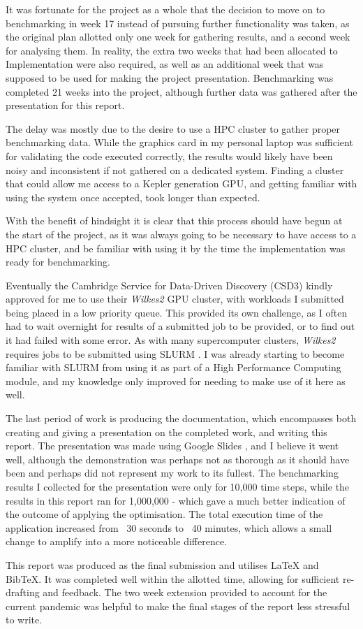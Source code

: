 It was fortunate for the project as a whole that the decision to move on to benchmarking in week 17 instead of pursuing further functionality was taken, as the original plan allotted only one week for gathering results, and a second week for analysing them. In reality, the extra two weeks that had been allocated to Implementation were also required, as well as an additional week that was supposed to be used for making the project presentation. Benchmarking was completed 21 weeks into the project, although further data was gathered after the presentation for this report.
\par
The delay was mostly due to the desire to use a HPC cluster to gather proper benchmarking data. While the graphics card in my personal laptop was sufficient for validating the code executed correctly, the results would likely have been noisy and inconsistent if not gathered on a dedicated system. Finding a cluster that could allow me access to a Kepler generation GPU, and getting familiar with using the system once accepted, took longer than expected.
\par
With the benefit of hindsight it is clear that this process should have begun at the start of the project, as it was always going to be necessary to have access to a HPC cluster, and be familiar with using it by the time the implementation was ready for benchmarking.
\par
Eventually the Cambridge Service for Data-Driven Discovery (CSD3) kindly approved for me to use their \textit{Wilkes2} GPU cluster, with workloads I submitted being placed in a low priority queue. This provided its own challenge, as I often had to wait overnight for results of a submitted job to be provided, or to find out it had failed with some error. As with many supercomputer clusters, \textit{Wilkes2} requires jobs to be submitted using SLURM \cite{slurm}. I was already starting to become familiar with SLURM from using it as part of a High Performance Computing module, and my knowledge only improved for needing to make use of it here as well.

The last period of work is producing the documentation, which encompasses both creating and giving a presentation on the completed work, and writing this report. The presentation was made using Google Slides \cite{gslides}, and I believe it went well, although the demonstration was perhaps not as thorough as it should have been and perhaps did not represent my work to its fullest. The benchmarking results I collected for the presentation were only for 10,000 time steps, while the results in this report ran for 1,000,000 - which gave a much better indication of the outcome of applying the optimisation. The total execution time of the application increased from ~30 seconds to ~40 minutes, which allows a small change to amplify into a more noticeable difference.
\par
This report was produced as the final submission and utilises LaTeX and BibTeX. It was completed well within the allotted time, allowing for sufficient re-drafting and feedback. The two week extension provided to account for the current pandemic was helpful to make the final stages of the report less stressful to write.

